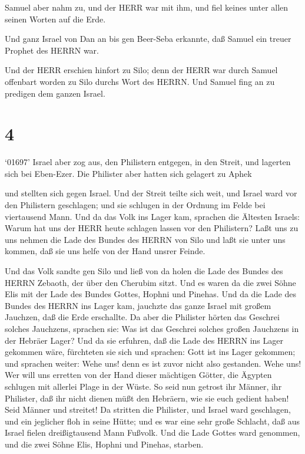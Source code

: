 Samuel aber nahm zu, und der HERR war mit ihm, und fiel
keines unter allen seinen Worten auf die Erde.

 Und ganz Israel von Dan an bis gen Beer-Seba erkannte, daß
Samuel ein treuer Prophet des HERRN war.

 Und der HERR erschien hinfort zu Silo; denn der HERR war
durch Samuel offenbart worden zu Silo durchs Wort des HERRN. Und Samuel
fing an zu predigen dem ganzen Israel.

\hypertarget{section-3}{%
\section{4}\label{section-3}}

 `01697' Israel aber zog aus, den Philistern entgegen, in
den Streit, und lagerten sich bei Eben-Ezer. Die Philister aber hatten
sich gelagert zu Aphek

 und stellten sich gegen Israel. Und der Streit teilte sich
weit, und Israel ward vor den Philistern geschlagen; und sie schlugen in
der Ordnung im Felde bei viertausend Mann.  Und da das Volk
ins Lager kam, sprachen die Ältesten Israels: Warum hat uns der HERR
heute schlagen lassen vor den Philistern? Laßt uns zu uns nehmen die
Lade des Bundes des HERRN von Silo und laßt sie unter uns kommen, daß
sie uns helfe von der Hand unsrer Feinde.

 Und das Volk sandte gen Silo und ließ von da holen die Lade
des Bundes des HERRN Zebaoth, der über den Cherubim sitzt. Und es waren
da die zwei Söhne Elis mit der Lade des Bundes Gottes, Hophni und
Pinehas.  Und da die Lade des Bundes des HERRN ins Lager
kam, jauchzte das ganze Israel mit großem Jauchzen, daß die Erde
erschallte.  Da aber die Philister hörten das Geschrei
solches Jauchzens, sprachen sie: Was ist das Geschrei solches großen
Jauchzens in der Hebräer Lager? Und da sie erfuhren, daß die Lade des
HERRN ins Lager gekommen wäre,  fürchteten sie sich und
sprachen: Gott ist ins Lager gekommen; und sprachen weiter: Wehe uns!
denn es ist zuvor nicht also gestanden.  Wehe uns! Wer will
uns erretten von der Hand dieser mächtigen Götter, die Ägypten schlugen
mit allerlei Plage in der Wüste.  So seid nun getrost ihr
Männer, ihr Philister, daß ihr nicht dienen müßt den Hebräern, wie sie
euch gedient haben! Seid Männer und streitet!  Da stritten
die Philister, und Israel ward geschlagen, und ein jeglicher floh in
seine Hütte; und es war eine sehr große Schlacht, daß aus Israel fielen
dreißigtausend Mann Fußvolk.  Und die Lade Gottes ward
genommen, und die zwei Söhne Elis, Hophni und Pinehas, starben.

